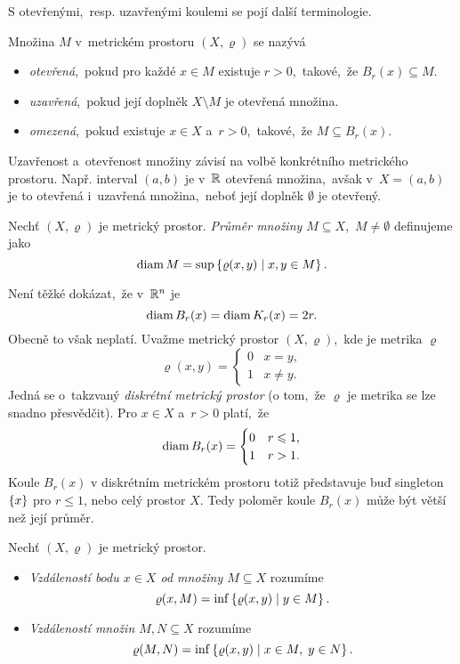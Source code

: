 S otevřenými,~resp. uzavřenými koulemi se pojí další terminologie.
\begin{definition}\label{def:otevrena-uzavrena-omezena-mnozina}
     Množina $M$ v~metrickém prostoru $(X,\varrho)$ se nazývá
     \begin{itemize}
        \item \emph{otevřená},~pokud pro každé $x\in M$ existuje $r>0$,~takové,~že $B_r(x)\subseteq M$.
        \item \emph{uzavřená},~pokud její doplněk $X\setminus M$ je otevřená množina.
        \item \emph{omezená},~pokud existuje $x\in X$ a~$r>0$,~takové,~že $M\subseteq B_r(x)$.
     \end{itemize}
\end{definition}
Uzavřenost a~otevřenost množiny závisí na volbě konkrétního metrického prostoru. Např. interval $(a,b)$ je v~$\mathbb{R}$ otevřená množina,~avšak v~$X=(a,b)$ je to otevřená i~uzavřená množina,~neboť její doplněk $\emptyset$ je otevřený.
\begin{definition}\label{def:prumer-mnoziny}
    Nechť $(X,\varrho)$ je metrický prostor. \emph{Průměr množiny $M\subseteq X$},~$M\neq\emptyset$ definujeme jako
    \[\operatorname{diam}{M}=\sup\left\{\varrho(x,y)\mid x,y\in M\right\}.\]
\end{definition}
Není těžké dokázat,~že v~$\mathbb{R}^n$ je
\[\operatorname{diam}{B_r(x)}=\operatorname{diam}{K_r(x)}=2r.\]
Obecně to však neplatí. Uvažme metrický prostor $(X,\varrho)$,~kde je metrika $\varrho$
\[\varrho(x,y)=\begin{cases}
    0 & x=y,\\
    1 & x\neq y.
\end{cases}\]
Jedná se o~takzvaný \emph{diskrétní metrický prostor} (o tom,~že $\varrho$ je metrika se lze snadno přesvědčit). Pro $x\in X$ a~$r>0$ platí,~že
\[\operatorname{diam}{B_r(x)}=\begin{cases}
    0 & r\leqslant 1,\\
    1 & r>1.
\end{cases}\]
Koule $B_r(x)$ v diskrétním metrickém prostoru totiž představuje buď singleton $\left\{x\right\}$ pro $r\leqslant 1$, nebo celý prostor $X$. Tedy poloměr koule $B_r(x)$ může být větší než její průměr.

\begin{definition}\label{def:vzdalenost-bodu-od-mnoziny-vzdalenost-mnozin}
    Nechť $(X,\varrho)$ je metrický prostor.
    \begin{itemize}
        \item {}\emph{Vzdáleností bodu $x\in X$ od množiny $M\subseteq X$} rozumíme
        \[\varrho(x,M)=\inf\left\{\varrho(x,y)\mid y\in M\right\}.\]
        \item {}\emph{Vzdáleností množin $M,N\subseteq X$} rozumíme
        \[\varrho(M,N)=\inf\left\{\varrho(x,y)\mid x\in M,\;y\in N\right\}.\]
    \end{itemize}
\end{definition}

